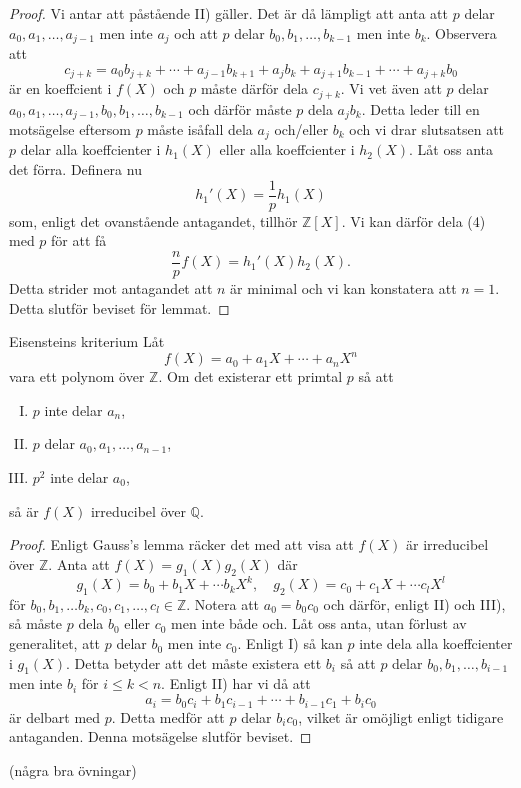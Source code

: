 \documentclass{article}
\theoremstyle{definition}
\begin{document}
\begin{proof}
  Vi antar att påstående II) gäller. Det är då lämpligt att anta att $p$ delar $a_0, a_{1}, \ldots, a_{j-1}$ men inte $a_j$ och att 
  $p$ delar $b_0, b_{1}, \ldots, b_{k-1}$ men inte $b_k$. Observera att
  \[c_{j+k} = a_0b_{j+k} + \cdots + a_{j-1}b_{k+1} + a_jb_k + a_{j+1}b_{k-1} + \cdots + a_{j+k}b_0\]
  är en koeffcient i $f(X)$ och $p$ måste därför dela $c_{j+k}$. Vi vet även att $p$ delar $a_0, a_{1}, \ldots, a_{j-1}, b_0, b_{1}, \ldots, b_{k-1}$ 
  och därför måste $p$ dela $a_j b_k$. Detta leder till en motsägelse eftersom $p$ måste isåfall dela $a_j$ och/eller $b_k$ och vi drar slutsatsen att 
  $p$ delar alla koeffcienter i $h_1(X)$ eller alla koeffcienter i $h_2(X)$. Låt oss anta det förra. Definera nu 
  \[h_1'(X) = \frac{1}{p} h_1(X)\]
  som, enligt det ovanstående antagandet, tillhör $\mathbb{Z}[X].$ Vi kan därför dela (4) med $p$ för att få
  \[\frac{n}{p} f(X) = h_1'(X) h_2(X).\]
  Detta strider mot antagandet att $n$ är minimal och vi kan konstatera att $n=1$. Detta slutför beviset för lemmat.
\end{proof}

\begin{mytheo}{Eisensteins kriterium}{}
  Låt
  \[f(X) = a_0 + a_1X + \cdots + a_nX^n\]
  vara ett polynom över $\mathbb{Z}$. Om det existerar ett primtal $p$ så att 
  \begin{enumerate}[I)]
    \item $p$ inte delar $a_n$,
    \item $p$ delar $a_0, a_1, \ldots, a_{n-1}$,
    \item $p^2$ inte delar $a_0$,
  \end{enumerate}
  så är $f(X)$ irreducibel över $\mathbb{Q}$.
\end{mytheo}
\begin{proof}
  Enligt Gauss's lemma räcker det med att visa att $f(X)$ är irreducibel över $\mathbb{Z}$. Anta att $f(X) = g_1(X) g_2(X)$ där 
  \[g_1(X) = b_0 + b_1X + \cdots b_kX^k, \quad g_2(X) = c_0 + c_1X + \cdots c_lX^l\]
  för $b_0, b_1, \ldots b_k, c_0, c_1, \ldots, c_l \in \mathbb{Z}.$
  Notera att $a_0 = b_0 c_0$ och därför, enligt II) och III), så måste $p$ dela $b_0$ eller $c_0$ men inte både och. Låt oss anta, utan förlust av 
  generalitet, att $p$ delar $b_0$ men inte $c_0$. Enligt I) så kan $p$ inte dela alla koeffcienter i $g_1(X)$. Detta betyder att det måste existera ett $b_i$ så att $p$ delar
  $b_0, b_1, \ldots, b_{i-1}$ men inte $b_i$ för $i \leq k < n$. Enligt II) har vi då att 
  \[a_i = b_0c_i + b_1c_{i-1} + \cdots + b_{i-1}c_1 + b_ic_0\]
  är delbart med $p$. Detta medför att $p$ delar $b_i c_0$, vilket är omöjligt enligt tidigare antaganden.
  Denna motsägelse slutför beviset.
\end{proof}
(några bra övningar)
\end{document}
